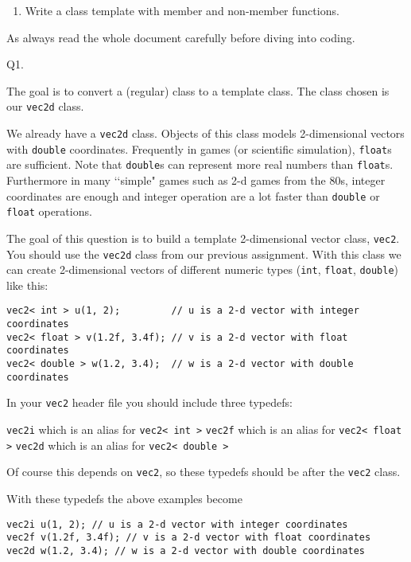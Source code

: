 


\renewcommand\TITLE{Assignment 13}


\topmatter

\objectives
{
    \begin{enumerate}
        \item Write a class template with member and non-member functions.
    \end{enumerate}
}

As always read the whole document carefully before diving into coding.


\newpage
Q1.

The goal is to convert a (regular) class to a template class. The class chosen is our
\verb!vec2d! class.

We already have a \verb!vec2d! class.
Objects of this class models 2-dimensional vectors with \verb!double!
coordinates.
Frequently in games (or scientific simulation),
\verb!float!s are sufficient.
Note that \verb!double!s can represent more real numbers than \verb!float!s.
Furthermore in many \lq\lq simple" games such as 2-d games from the 80s,
integer coordinates are enough and integer operation are a lot faster than
\verb!double! or \verb!float! operations. 

The goal of this question is to build a template 2-dimensional vector class,
\verb!vec2!.
You should use the \verb!vec2d! class from our previous assignment.
With this class we
can create 2-dimensional vectors of different numeric types
(\verb!int!, \verb!float!, \verb!double!) like this:
\begin{Verbatim}[frame=single]
vec2< int > u(1, 2);         // u is a 2-d vector with integer coordinates
vec2< float > v(1.2f, 3.4f); // v is a 2-d vector with float coordinates
vec2< double > w(1.2, 3.4);  // w is a 2-d vector with double coordinates
\end{Verbatim}
  
In your \verb!vec2! header file you should include three typedefs:
\begin{tightlist}
\li \verb!vec2i! which is an alias for \verb!vec2< int >!
\li \verb!vec2f! which is an alias for \verb!vec2< float >!
\li \verb!vec2d! which is an alias for \verb!vec2< double >!
\end{tightlist}
Of course this depends on \verb!vec2!,
so these typedefs should be after the \verb!vec2! class.

With these typedefs the above examples become
\begin{Verbatim}[frame=single]
vec2i u(1, 2); // u is a 2-d vector with integer coordinates
vec2f v(1.2f, 3.4f); // v is a 2-d vector with float coordinates
vec2d w(1.2, 3.4); // w is a 2-d vector with double coordinates
\end{Verbatim}


